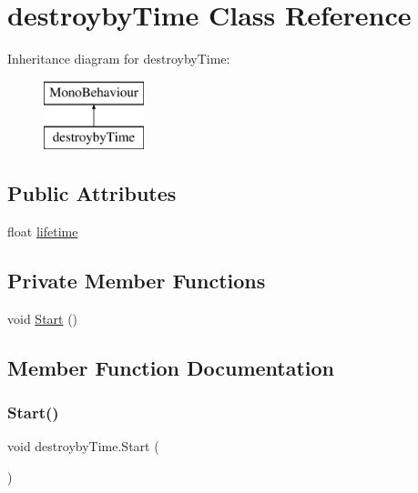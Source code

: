 \hypertarget{classdestroyby_time}{}\section{destroyby\+Time Class Reference}
\label{classdestroyby_time}
Inheritance diagram for destroyby\+Time\+:\begin{figure}[H]
\begin{center}
\leavevmode
\includegraphics[height=2.000000cm]{classdestroyby_time}
\end{center}
\end{figure}
\subsection*{Public Attributes}
\begin{DoxyCompactItemize}
\item 
float \mbox{\hyperlink{classdestroyby_time_ad617cd8d5ba772f54506f8c897792cde}{lifetime}}
\end{DoxyCompactItemize}
\subsection*{Private Member Functions}
\begin{DoxyCompactItemize}
\item 
void \mbox{\hyperlink{classdestroyby_time_ad317df088f79babcc4e438e83d64ed66}{Start}} ()
\end{DoxyCompactItemize}


\subsection{Member Function Documentation}
\mbox{\label{classdestroyby_time_ad317df088f79babcc4e438e83d64ed66}} 
\subsubsection{\texorpdfstring{Start()}{Start()}}
{\footnotesize\ttfamily void destroyby\+Time.\+Start (\begin{DoxyParamCaption}{ }\end{DoxyParamCaption})\hspace{0.3cm}{\ttfamily [private]}}



